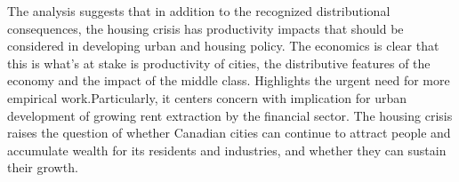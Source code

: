 The analysis suggests that in addition to the recognized distributional consequences, the housing crisis has productivity impacts that should be considered in developing urban and housing policy. 
The economics is clear that this is what's at stake is productivity of cities, the distributive features of the economy and the impact of the middle class.
Highlights the urgent need for more empirical work.Particularly, it centers concern with implication for urban development of growing rent extraction by the financial sector. 
The housing crisis raises the question of whether Canadian cities can continue to attract people and accumulate wealth for its residents and industries, and whether they can sustain their growth.











